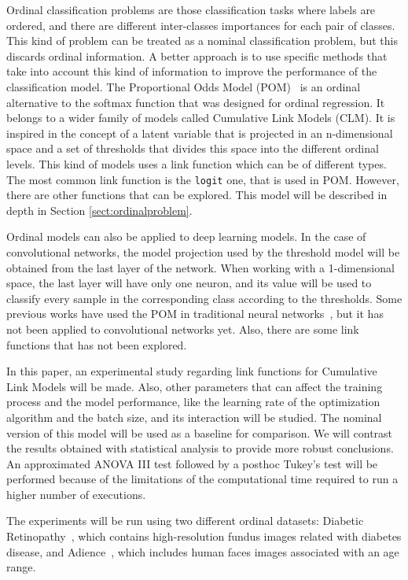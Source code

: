 \documentclass[journal]{IEEEtran}
\begin{document}
	Ordinal classification problems are those classification tasks where labels are ordered, and there are different inter-classes importances for each pair of classes. This kind of problem can be treated as a nominal classification problem, but this discards ordinal information. A better approach is to use specific methods that take into account this kind of information to improve the performance of the classification model. The Proportional Odds Model (POM)~\cite{agresti2010analysis} is an ordinal alternative to the softmax function that was designed for ordinal regression. It belongs to a wider family of models called Cumulative Link Models (CLM). It is inspired in the concept of a latent variable that is projected in an n-dimensional space and a set of thresholds that divides this space into the different ordinal levels. This kind of models uses a link function which can be of different types. The most common link function is the \texttt{logit} one, that is used in POM. However, there are other functions that can be explored. This model will be described in depth in Section \ref{sect:ordinalproblem}.
	
	Ordinal models can also be applied to deep learning models. In the case of convolutional networks, the model projection used by the threshold model will be obtained from the last layer of the network. When working with a 1-dimensional space, the last layer will have only one neuron, and its value will be used to classify every sample in the corresponding class according to the thresholds. Some previous works have used the POM in traditional neural networks~\cite{gutierrez2016ordinal}, but it has not been applied to convolutional networks yet. Also, there are some link functions that has not been explored.
	
	In this paper, an experimental study regarding link functions for Cumulative Link Models will be made. Also, other parameters that can affect the training process and the model performance, like the learning rate of the optimization algorithm and the batch size, and its interaction will be studied. The nominal version of this model will be used as a baseline for comparison. We will contrast the results obtained with statistical analysis to provide more robust conclusions. An approximated ANOVA III \cite{miller1997beyond} test followed by a posthoc Tukey's test \cite{tukey1949comparing} will be performed because of the limitations of the computational time required to run a higher number of executions.
	
	The experiments will be run using two different ordinal datasets: Diabetic Retinopathy~\cite{de2018weighted}, which contains high-resolution fundus images related with diabetes disease, and Adience~\cite{beckham2017unimodal}, which includes human faces images associated with an age range.
	
\end{document}
